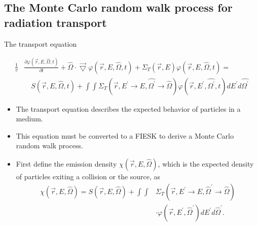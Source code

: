 \documentclass{beamer}
\begin{document}
\subsection{The Monte Carlo random walk process for radiation transport}
\begin{frame}{The transport equation}

\begin{equation*}
  \begin{split}
    \frac{1}{v}&\frac{\partial \varphi(\vec{r},E,\hat{\Omega},t)}{\partial t} +
    \hat{\Omega} \cdot \vec{\bigtriangledown} \varphi(\vec{r},E,\hat{\Omega},t)
    + \Sigma_T(\vec{r},E) \varphi(\vec{r},E,\hat{\Omega},t) = \\
    & \quad S(\vec{r},E,\hat{\Omega},t) +
    \int\int \Sigma_T(\vec{r},E^{'} \to E,\hat{\Omega^{'}} \to \hat{\Omega})
    \varphi(\vec{r},E^{'},\hat{\Omega^{'}},t) dE^{'}d\hat{\Omega^{'}} \nonumber
  \end{split}
\end{equation*}

  \begin{itemize}
    \item The transport equation describes the expected behavior of particles
      in a medium.
    \item This equation must be converted to a FIESK to derive a Monte Carlo
      random walk process.
    \item First define the emission density $\chi(\vec{r},E,\hat{\Omega})$, 
      which is the expected density of particles exiting a collision or the 
      source, as
      \newline
      \begin{align}
        \chi(\vec{r},E,\hat{\Omega}) = S(\vec{r},E,\hat{\Omega}) +
        \int\int &\Sigma_T(\vec{r},E^{'} \to E,\hat{\Omega}^{'} \to \hat{\Omega})
        \nonumber \\
        & \cdot \varphi(\vec{r},E^{'},\hat{\Omega}^{'}) dE^{'}d\hat{\Omega}^{'}.
        \nonumber
      \end{align}
  \end{itemize}

\end{frame}
\end{document}
